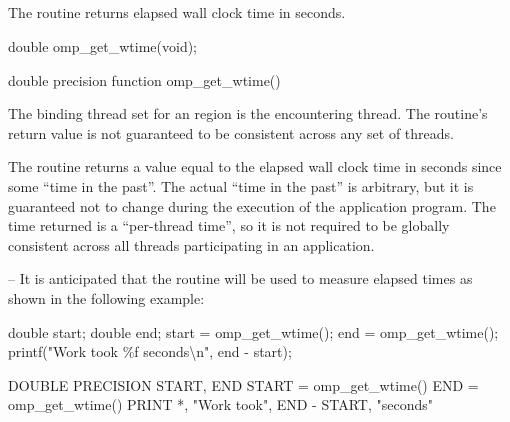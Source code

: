 \vspace{-12pt}









\subsection{}
\label{subsec:omp_get_wtime}
\summary
The  routine returns elapsed wall clock time in seconds.

\format
\ccppspecificstart
\begin{boxedcode}
double omp\_get\_wtime(void);
\end{boxedcode}
\ccppspecificend

\fortranspecificstart
\begin{boxedcode}
double precision function omp\_get\_wtime()
\end{boxedcode}
\fortranspecificend

\binding
The binding thread set for an  region is the encountering thread. The 
routine’s return value is not guaranteed to be consistent across any set of threads.

\effect
The  routine returns a value equal to the elapsed wall clock time in 
seconds since some ``time in the past''. The actual ``time in the past'' is arbitrary, but it is 
guaranteed not to change during the execution of the application program. The time 
returned is a ``per-thread time'', so it is not required to be globally consistent across all 
threads participating in an application.

\notestart
\noteheader -- It is anticipated that the routine will be used to measure elapsed times as shown 
in the following example:

\ccppspecificstart
\begin{boxedcode}
double start;
double end;
start = omp\_get\_wtime();
end = omp\_get\_wtime();
printf("Work took \%f seconds{\textbackslash}n", end - start);
\end{boxedcode}
\ccppspecificend

\fortranspecificstart
\begin{boxedcode}
DOUBLE PRECISION START, END
START = omp\_get\_wtime()
END = omp\_get\_wtime()
PRINT *, "Work took", END - START, "seconds"
\end{boxedcode}
\fortranspecificend
\noteend










